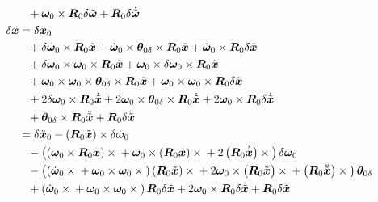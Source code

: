 \documentclass[10pt,fleqn,subeqn]{report}
\newcommand{\T}[1]{\bm{#1}}
\newcommand{\TT}[1]{\bm{#1}}
\begin{document}
\begin{subequations}
\begin{align}
		\nonumber \\
		&\hphantom{=}+ \T{\omega}_0 \times \TT{R}_0 \delta\tilde{\T{\omega}}
		+ \TT{R}_0 \delta\dot{\tilde{\T{\omega}}} \\
	\delta\ddot{\T{x}} &= \delta\ddot{\T{x}}_0
		\nonumber \\
		&\hphantom{=}+ \delta\dot{\T{\omega}}_0 \times \TT{R}_0 \tilde{\T{x}}
		+ \dot{\T{\omega}}_0 \times \T{\theta}_{0\delta}\times\TT{R}_0 \tilde{\T{x}}
		+ \dot{\T{\omega}}_0 \times \TT{R}_0 \delta\tilde{\T{x}}
		\nonumber \\
		&\hphantom{=}+ \delta\T{\omega}_0 \times \T{\omega}_0 \times \TT{R}_0 \tilde{\T{x}}
		+ \T{\omega}_0 \times \delta\T{\omega}_0 \times \TT{R}_0 \tilde{\T{x}}
		\nonumber \\
		&\hphantom{=}+ \T{\omega}_0 \times \T{\omega}_0 \times \T{\theta}_{0\delta}\times\TT{R}_0 \tilde{\T{x}}
		+ \T{\omega}_0 \times \T{\omega}_0 \times \TT{R}_0 \delta\tilde{\T{x}}
		\nonumber \\
		&\hphantom{=}+ 2 \delta\T{\omega}_0 \times \TT{R}_0 \dot{\tilde{\T{x}}}
		+ 2 \T{\omega}_0 \times \T{\theta}_{0\delta}\times\TT{R}_0 \dot{\tilde{\T{x}}}
		+ 2 \T{\omega}_0 \times \TT{R}_0 \delta\dot{\tilde{\T{x}}}
		\nonumber \\
		&\hphantom{=}+ \T{\theta}_{0\delta}\times\TT{R}_0 \ddot{\tilde{\T{x}}}
		+ \TT{R}_0 \delta\ddot{\tilde{\T{x}}}
		\nonumber \\
	&= \delta\ddot{\T{x}}_0 - \plbr{\TT{R}_0 \tilde{\T{x}}} \times \delta\dot{\T{\omega}}_0
		\nonumber \\
		&\hphantom{=}- \plbr{
			\plbr{\T{\omega}_0 \times \TT{R}_0 \tilde{\T{x}}} \times{}
			+ \T{\omega}_0 \times \plbr{\TT{R}_0 \tilde{\T{x}}} \times{}
			+ 2 \plbr{\TT{R}_0 \dot{\tilde{\T{x}}}} \times{}
		} \delta\T{\omega}_0
		\nonumber \\
		&\hphantom{=}- \plbr{
			\plbr{
				\dot{\T{\omega}}_0 \times{}
				+ \T{\omega}_0 \times \T{\omega}_0 \times{}
			} \plbr{\TT{R}_0 \tilde{\T{x}}} \times{}
			+ 2 \T{\omega}_0 \times \plbr{\TT{R}_0 \dot{\tilde{\T{x}}}} \times{}
			+ \plbr{\TT{R}_0 \ddot{\tilde{\T{x}}}} \times{}
		}\T{\theta}_{0\delta}
		\nonumber \\
		&\hphantom{=}+ \plbr{
			\dot{\T{\omega}}_0 \times{}
			+ \T{\omega}_0 \times \T{\omega}_0 \times{}
		} \TT{R}_0 \delta\tilde{\T{x}}
%
		+ 2 \T{\omega}_0 \times \TT{R}_0 \delta\dot{\tilde{\T{x}}}
%
		+ \TT{R}_0 \delta\ddot{\tilde{\T{x}}}
\end{align}
\end{subequations}
\end{document}
